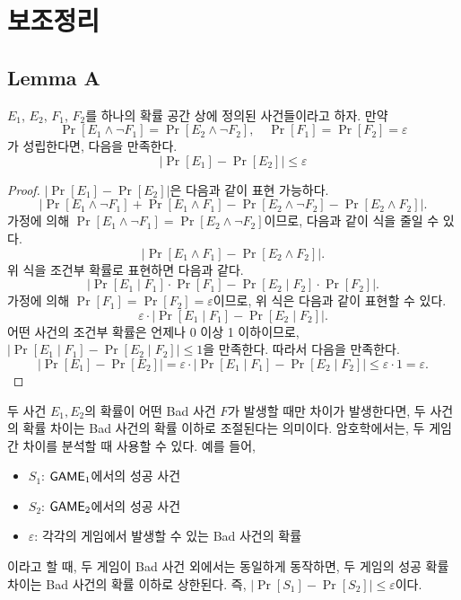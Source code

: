 \section{보조정리}

\subsection{Lemma A}

\begin{tcolorbox}[colback=white, sharp corners, boxrule=0.7pt]
    \begin{lemma}
        $E_1$, $E_2$, $F_1$, $F_2$를 하나의 확률 공간 상에 정의된 사건들이라고
        하자. 만약
        $$
            \Pr[E_1 \land \neg F_1] = \Pr[E_2 \land \neg F_2], \quad \Pr[F_1] = \Pr[F_2] = \varepsilon
        $$
        가 성립한다면, 다음을 만족한다.
        $$
            |\Pr[E_1] - \Pr[E_2]| \leq \varepsilon
        $$
    \end{lemma}
\end{tcolorbox}

\begin{proof}
    $|\Pr[E_1] - \Pr[E_2]|$은 다음과 같이 표현 가능하다.
    $$
        |\Pr[E_1 \land \neg F_1] + \Pr[E_1 \land F_1] - \Pr[E_2 \land \neg F_2] - \Pr[E_2 \land F_2]|.
    $$
    가정에 의해 $\Pr[E_1 \land \neg F_1] = \Pr[E_2 \land \neg F_2]$이므로, 다음과 같이 식을 줄일 수 있다.
    $$
        |\Pr[E_1 \land F_1] - \Pr[E_2 \land F_2]|.
    $$
    위 식을 조건부 확률로 표현하면 다음과 같다.
    $$
        |\Pr[E_1 \mid F_1] \cdot \Pr[F_1] - \Pr[E_2 \mid F_2] \cdot \Pr[F_2]|.
    $$
    가정에 의해 $\Pr[F_1] = \Pr[F_2] = \varepsilon$이므로, 위 식은 다음과 같이
    표현할 수 있다.
    $$
    \varepsilon \cdot |\Pr[E_1 \mid F_1]- \Pr[E_2 \mid F_2]|.
    $$
    어떤 사건의 조건부 확률은 언제나 0 이상 1 이하이므로, $|\Pr[E_1 \mid F_1] -
    \Pr[E_2 \mid F_2]| \leq 1$을 만족한다. 따라서 다음을 만족한다.
    $$
    |\Pr[E_1] - \Pr[E_2]| = \varepsilon \cdot |\Pr[E_1 \mid F_1] - \Pr[E_2 \mid F_2]| \leq \varepsilon \cdot 1 = \varepsilon.
    $$
\end{proof}

\begin{memo}
    두 사건 $E_1, E_2$의 확률이 어떤 Bad 사건 $F$가 발생할 때만 차이가
    발생한다면, 두 사건의 확률 차이는 Bad 사건의 확률 이하로 조절된다는
    의미이다. 암호학에서는, 두 게임 간 차이를 분석할 때 사용할 수 있다. 예를 들어, 
    \begin{itemize}
        \item $S_1$: $\textsf{GAME}_1$에서의 성공 사건
        \item $S_2$: $\textsf{GAME}_2$에서의 성공 사건
        \item $\varepsilon$: 각각의 게임에서 발생할 수 있는 Bad 사건의 확률
    \end{itemize}
    이라고 할 때, 두 게임이 Bad 사건 외에서는 동일하게 동작하면, 두 게임의 성공
    확률 차이는 Bad 사건의 확률 이하로 상한된다. 즉, $|\Pr[S_1] - \Pr[S_2]| \leq \varepsilon$이다.
\end{memo}

